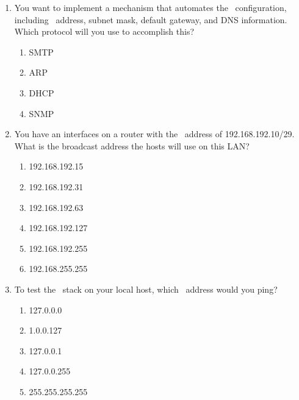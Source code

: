 \begin{enumerate}
\begin{multicols}{2}
\begin{enumerate}
   \item 200.10.5.56
   \item 200.10.5.32
   \item 200.10.5.64
   \item 200.10.5.0
   \end{enumerate}
   \end{multicols}
\item
   You want to implement a mechanism that automates the \IP\ configuration, including \IP\ address, subnet mask, default gateway, and \acs{DNS} information.
   Which protocol will you use to accomplish this?
   \begin{multicols}{2}
   \begin{enumerate}
   \item \acs{SMTP}
   \item \acs{ARP}
   \item \acs{DHCP}
   \item \acs{SNMP}
   \end{enumerate}
   \end{multicols}
\item
   You have an interfaces on a router with the \IP\ address of 192.168.192.10/29.
   What is the broadcast address the hosts will use on this \acs{LAN}?
   \begin{multicols}{2}
   \begin{enumerate}
   \item 192.168.192.15
   \item 192.168.192.31
   \item 192.168.192.63
   \item 192.168.192.127
   \item 192.168.192.255
   \item 192.168.255.255
   \end{enumerate}
   \end{multicols}
\item
   To test the \IP\ stack on your local host, which \IP\ address would you ping?
   \begin{multicols}{2}
   \raggedcolumns
   \begin{enumerate}
   \item 127.0.0.0
   \item 1.0.0.127
   \item 127.0.0.1
   \item 127.0.0.255
   \item 255.255.255.255
   \end{enumerate}
   \end{multicols}

\end{enumerate}
